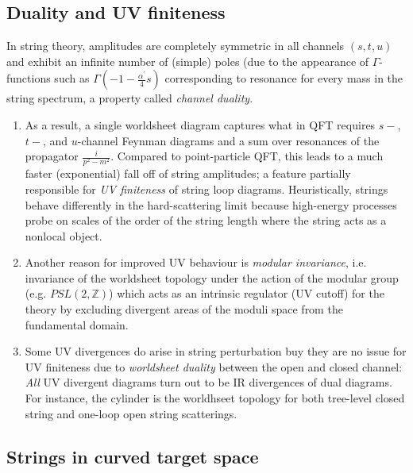 \subsection{Duality and UV finiteness}
In string theory, amplitudes are completely symmetric in all channels $(s,t,u)$ and exhibit an infinite number of (simple) poles (due to the appearance of $\Gamma$-functions such as $\Gamma(-1-\frac{\alpha^\prime}{4} s)$ corresponding to resonance for every mass in the string spectrum, a property called \emph{channel duality}.
\begin{enumerate}
	\item As a result, a single worldsheet diagram captures what in QFT requires $s-$, $t-$, and $u$-channel Feynman diagrams and a sum over resonances of the propagator $\frac{i}{p^2-m^2}$. Compared to point-particle QFT, this leads to a much faster (exponential) fall off of string amplitudes; a feature partially responsible for \emph{UV finiteness} of string loop diagrams. Heuristically, strings behave differently in the hard-scattering limit because high-energy processes probe on scales of the order of the string length where the string acts as a nonlocal object.
	\item Another reason for improved UV behaviour is \emph{modular invariance}, i.e. invariance of the worldsheet topology under the action of the modular group (e.g. $PSL(2,\mathbb{Z})$) which acts as an intrinsic regulator (UV cutoff) for the theory by excluding divergent areas of the moduli space from the fundamental domain.
	\item Some UV divergences do arise in string perturbation buy they are no issue for UV finiteness due to \emph{worldsheet duality} between the open and closed channel:\\
	\emph{All} UV divergent diagrams turn out to be IR divergences of dual diagrams. For instance, the cylinder is the worldhseet topology for both tree-level closed string and one-loop open string scatterings.
\end{enumerate}

\subsection{Strings in curved target space}
